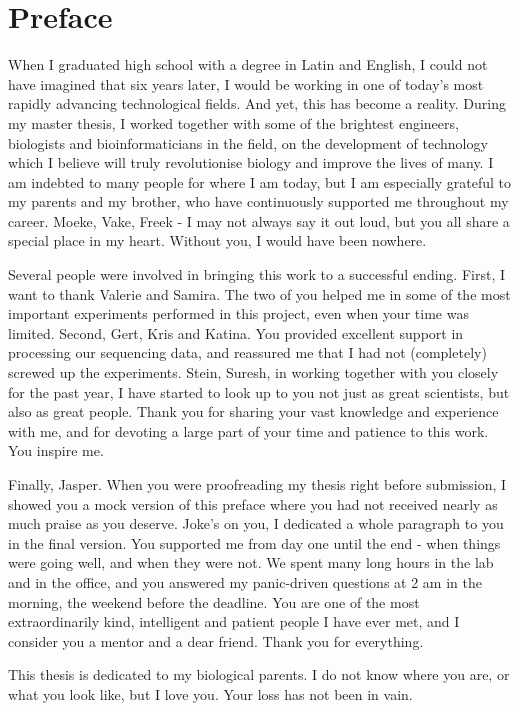 \chapter*{Preface}
When I graduated high school with a degree in Latin and English, I could not have imagined that six years later, I would be working in one of today's most rapidly advancing technological fields. And yet, this has become a reality. During my master thesis, I worked together with some of the brightest engineers, biologists and bioinformaticians in the field, on the development of technology which I believe will truly revolutionise biology and improve the lives of many. I am indebted to many people for where I am today, but I am especially grateful to my parents and my brother, who have continuously supported me throughout my career. Moeke, Vake, Freek - I may not always say it out loud, but you all share a special place in my heart. Without you, I would have been nowhere.\pms

Several people were involved in bringing this work to a successful ending. First, I want to thank Valerie and Samira. The two of you helped me in some of the most important experiments performed in this project, even when your time was limited. Second, Gert, Kris and Katina. You provided excellent support in processing our sequencing data, and reassured me that I had not (completely) screwed up the experiments. Stein, Suresh, in working together with you closely for the past year, I have started to look up to you not just as great scientists, but also as great people. Thank you for sharing your vast knowledge and experience with me, and for devoting a large part of your time and patience to this work. You inspire me.\pms

Finally, Jasper. When you were proofreading my thesis right before submission, I showed you a mock version of this preface where you had not received nearly as much praise as you deserve. Joke's on you, I dedicated a whole paragraph to you in the final version. You supported me from day one until the end - when things were going well, and when they were not. We spent many long hours in the lab and in the office, and you answered my panic-driven questions at 2 am in the morning, the weekend before the deadline. You are one of the most extraordinarily kind, intelligent and patient people I have ever met, and I consider you a mentor and a dear friend. Thank you for everything.\pms

\vspace{36pt}
This thesis is dedicated to my biological parents. I do not know where you are, or what you look like, but I love you. Your loss has not been in vain.\pms
